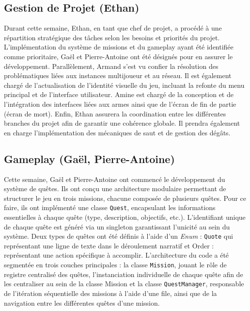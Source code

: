 \documentclass{report}
\begin{document}
\subsection*{Gestion de Projet (Ethan)}
Durant cette semaine, Ethan, en tant que chef de projet, a procédé à une répartition stratégique des tâches selon les besoins et priorités du projet. L’implémentation du système de missions et du gameplay ayant été identifiée comme prioritaire, Gaël et Pierre-Antoine ont été désignés pour en assurer le développement.
Parallèlement, Armand s’est vu confier la résolution des problématiques liées aux instances multijoueur et au réseau. Il est également chargé de l’actualisation de l’identité visuelle du jeu, incluant la refonte du menu principal et de l’interface utilisateur. Amine est chargé de la conception et de l’intégration des interfaces liées aux armes ainsi que de l’écran de fin de partie (écran de mort).
Enfin, Ethan assurera la coordination entre les différentes branches du projet afin de garantir une cohérence globale. Il prendra également en charge l’implémentation des mécaniques de saut et de gestion des dégâts.


\subsection*{Gameplay (Gaël, Pierre-Antoine)}
Cette semaine, Gaël et Pierre-Antoine ont commencé le développement du système de quêtes. Ils ont conçu une architecture modulaire permettant de structurer le jeu en trois missions, chacune composée de plusieurs quêtes. Pour ce faire, ils ont implémenté une classe \texttt{Quest}, encapsulant les informations essentielles à chaque quête (type, description, objectifs, etc.). L’identifiant unique de chaque quête est généré via un singleton garantissant l’unicité au sein du système. Deux types de quêtes ont été définis à l’aide d’un \textit{Enum} : \texttt{Quote} qui représentant une ligne de texte dans le déroulement narratif et Order : représentant une action spécifique à accomplir. L’architecture du code a été segmentée en trois couches principales : la classe \texttt{Mission}, jouant le rôle de registre centralisé des quêtes, l’instanciation individuelle de chaque quête afin de les centraliser au sein de la classe Mission et la classe \texttt{QuestManager}, responsable de l’itération séquentielle des missions à l’aide d’une file, ainsi que de la navigation entre les différentes quêtes d’une mission.
\end{document}
